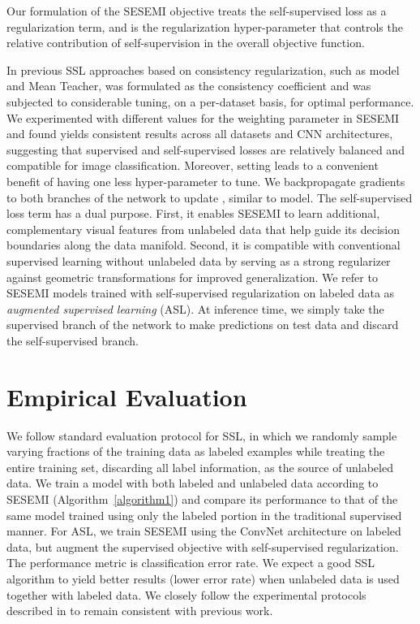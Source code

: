 \documentclass{article}
\begin{document}
Our formulation of the SESEMI objective treats the self-supervised loss as a regularization term, and  is the regularization hyper-parameter that controls the relative contribution of self-supervision in the overall objective function.

In previous SSL approaches based on consistency regularization, such as  model and Mean Teacher,  was formulated as the consistency coefficient and was subjected to considerable tuning, on a per-dataset basis, for optimal performance. We experimented with different values for the weighting parameter  in SESEMI and found  yields consistent results across all datasets and CNN architectures, suggesting that supervised and self-supervised losses are relatively balanced and compatible for image classification. Moreover, setting  leads to a convenient benefit of having one less hyper-parameter to tune. We backpropagate gradients to both branches of the network to update , similar to  model. The self-supervised loss term has a dual purpose. First, it enables SESEMI to learn additional, complementary visual features from unlabeled data that help guide its decision boundaries along the data manifold. Second, it is compatible with conventional supervised learning without unlabeled data by serving as a strong regularizer against geometric transformations for improved generalization. We refer to SESEMI models trained with self-supervised regularization on labeled data  as \emph{augmented supervised learning} (ASL). At inference time, we simply take the supervised branch of the network to make predictions on test data and discard the self-supervised branch.

\section{Empirical Evaluation}
We follow standard evaluation protocol for SSL, in which we randomly sample varying fractions of the training data as labeled examples while treating the entire training set, discarding all label information, as the source of unlabeled data. We train a model with both labeled and unlabeled data according to SESEMI (Algorithm~\ref{algorithm1}) and compare its performance to that of the same model trained using only the labeled portion in the traditional supervised manner. For ASL, we train SESEMI using the ConvNet architecture on labeled data, but augment the supervised objective with self-supervised regularization. The performance metric is classification error rate. We expect a good SSL algorithm to yield better results (lower error rate) when unlabeled data is used together with labeled data. We closely follow the experimental protocols described in \cite{rotations,tempens,mean-teacher,ssl-eval} to remain consistent with previous work.
\end{document}
